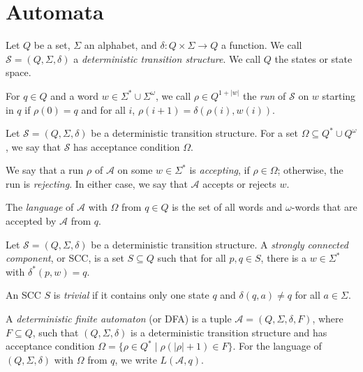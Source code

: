 \section{Automata}

\begin{defn}
	Let $Q$ be a set, $\Sigma$ an alphabet, and $\delta : Q \times \Sigma \rightarrow Q$ a function. We call $\mathcal{S} = (Q, \Sigma, \delta)$ a \emph{deterministic transition structure}. We call $Q$ the states or state space.
	
	For $q \in Q$ and a word $w \in \Sigma^* \cup \Sigma^\omega$, we call $\rho \in Q^{1+|w|}$ the \emph{run} of $\mathcal{S}$ on $w$ starting in $q$ if $\rho(0) = q$ and for all $i$, $\rho(i+1) = \delta(\rho(i), w(i))$.
\end{defn}

\begin{defn}
	Let $\mathcal{S} = (Q, \Sigma, \delta)$ be a deterministic transition structure. For a set $\Omega \subseteq Q^* \cup Q^\omega$, we say that $\mathcal{S}$ has acceptance condition $\Omega$.
	
	We say that a run $\rho$ of $\mathcal{A}$ on some $w \in \Sigma^*$ is \emph{accepting}, if $\rho \in \Omega$; otherwise, the run is \emph{rejecting}. In either case, we say that $\mathcal{A}$ accepts or rejects $w$. 
	
	The \emph{language} of $\mathcal{A}$ with $\Omega$ from $q \in Q$ is the set of all words and $\omega$-words that are accepted by $\mathcal{A}$ from $q$.
\end{defn}

\begin{defn}
	Let $\mathcal{S} = (Q, \Sigma, \delta)$ be a deterministic transition structure. A \emph{strongly connected component}, or SCC, is a set $S \subseteq Q$ such that for all $p, q \in S$, there is a $w \in \Sigma^*$ with $\delta^*(p, w) = q$.
	
	An SCC $S$ is \emph{trivial} if it contains only one state $q$ and $\delta(q, a) \neq q$ for all $a \in \Sigma$.
\end{defn}

\begin{defn}
	A \emph{deterministic finite automaton} (or DFA) is a tuple $\mathcal{A} = (Q, \Sigma, \delta, F)$, where $F \subseteq Q$, such that $(Q, \Sigma, \delta)$ is a deterministic transition structure and has acceptance condition $\Omega = \{ \rho \in Q^* \mid \rho(|\rho|+1) \in F \}$. For the language of $(Q, \Sigma, \delta)$ with $\Omega$ from $q$, we write $L(\mathcal{A}, q)$.
\end{defn}

